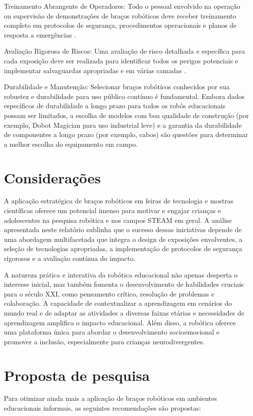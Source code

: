 \documentclass[%
  a4paper,%
  12pt,%
  fleqn,%
  english,%
  brazilian,%
]{article}
\begin{document}
\begin{description}
		\item Treinamento Abrangente de Operadores: Todo o pessoal envolvido na operação ou supervisão de demonstrações de braços robóticos deve receber treinamento completo em protocolos de segurança, procedimentos operacionais e planos de resposta a emergências \cite{kinovaJacoAssistiveTechnologies2025}.
		\item Avaliação Rigorosa de Riscos: Uma avaliação de risco detalhada e específica para cada exposição deve ser realizada para identificar todos os perigos potenciais e implementar salvaguardas apropriadas e em várias camadas \cite{top3dshopDobotMagicianReview2023}.
		\item Durabilidade e Manutenção: Selecionar braços robóticos conhecidos por sua robustez e durabilidade para uso público contínuo é fundamental. Embora dados específicos de durabilidade a longo prazo para todos os robôs educacionais possam ser limitados, a escolha de modelos com boa qualidade de construção (por exemplo, Dobot Magician para uso industrial leve) \cite{robotlabDobotClassroomPack2025} e a garantia da durabilidade de componentes a longo prazo (por exemplo, cabos) \cite{bostonDynamicsSpot2025} são questões para determinar a melhor escolha do equipamento em campo.
	\end{description}
	

\section{Considerações}
A aplicação estratégica de braços robóticos em feiras de tecnologia e mostras científicas oferece um potencial imenso para motivar e engajar crianças e adolescentes na pesquisa robótica e nos campos STEAM em geral. A análise apresentada neste relatório sublinha que o sucesso dessas iniciativas depende de uma abordagem multifacetada que integra o design de exposições envolventes, a seleção de tecnologias apropriadas, a implementação de protocolos de segurança rigorosos e a avaliação contínua do impacto.

A natureza prática e interativa da robótica educacional não apenas desperta o interesse inicial, mas também fomenta o desenvolvimento de habilidades cruciais para o século XXI, como pensamento crítico, resolução de problemas e colaboração. A capacidade de contextualizar a aprendizagem em cenários do mundo real e de adaptar as atividades a diversas faixas etárias e necessidades de aprendizagem amplifica o impacto educacional. Além disso, a robótica oferece uma plataforma única para abordar o desenvolvimento socioemocional e promover a inclusão, especialmente para crianças neurodivergentes.

\section{Proposta de pesquisa}
Para otimizar ainda mais a aplicação de braços robóticos em ambientes educacionais informais, as seguintes recomendações são propostas:

\printbibliography%
\end{document}
